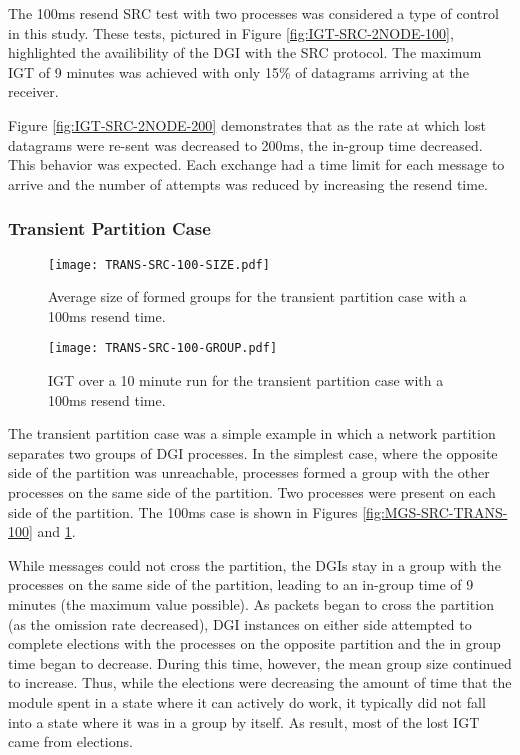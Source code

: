 The 100ms resend SRC test with two processes was considered a type of control in this study.
These tests, pictured in Figure \ref{fig:IGT-SRC-2NODE-100}, highlighted the availibility of the DGI with the SRC protocol.
The maximum \ac{IGT} of 9 minutes was achieved with only 15\% of datagrams arriving at the receiver. 

Figure \ref{fig:IGT-SRC-2NODE-200} demonstrates that as the rate at which lost datagrams were re-sent was decreased to 200ms, the in-group time decreased.
This behavior was expected.
Each exchange had a time limit for each message to arrive and the number of attempts was reduced by increasing the resend time.

\subsubsection{Transient Partition Case}

\begin{figure}
\centering
\begin{minipage}{0.45\textwidth}
    \centering
    \texttt{[image: TRANS-SRC-100-SIZE.pdf]}
    \caption{Average size of formed groups for the transient partition case with a 100ms resend time.}
    \label{fig:MGS-SRC-TRANS-100}
\end{minipage}%
\qquad
\begin{minipage}{0.45\textwidth}
    \centering
    \texttt{[image: TRANS-SRC-100-GROUP.pdf]}
    \caption{\ac{IGT} over a 10 minute run for the transient partition case with a 100ms resend time.}
    \label{fig:IGT-SRC-TRANS-100}
\end{minipage}
\end{figure}

The transient partition case was a simple example in which a network partition separates two groups of DGI processes.
In the simplest case, where the opposite side of the partition was unreachable, processes formed a group with the other processes on the same side of the partition.
Two processes were present on each side of the partition.
The 100ms case is shown in Figures \ref{fig:MGS-SRC-TRANS-100} and \ref{fig:IGT-SRC-TRANS-100}.

While messages could not cross the partition, the DGIs stay in a group with the processes on the same side of the partition, leading to an in-group time of 9 minutes (the maximum value possible).
As packets began to cross the partition (as the omission rate decreased), DGI instances on either side attempted to complete elections with the processes on the opposite partition and the in group time began to decrease.
During this time, however, the mean group size continued to increase.
Thus, while the elections were decreasing the amount of time that the module spent in a state where it can actively do work, it typically did not fall into a state where it was in a group by itself. 
As result, most of the lost \ac{IGT} came from elections.

